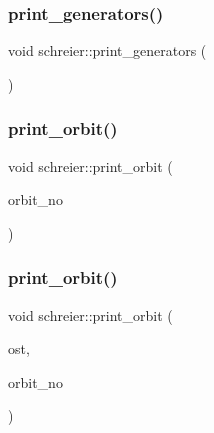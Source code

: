 \mbox{\label{classschreier_ac9fce8f85082d0bc5b4f5b8b18a99bab}} 
\subsubsection{\texorpdfstring{print\+\_\+generators()}{print\_generators()}}
{\footnotesize\ttfamily void schreier\+::print\+\_\+generators (\begin{DoxyParamCaption}{ }\end{DoxyParamCaption})}

\mbox{\label{classschreier_ac30bbfe09706ff8ccaf27c2cf8074594}} 
\subsubsection{\texorpdfstring{print\+\_\+orbit()}{print\_orbit()}\hspace{0.1cm}{\footnotesize\ttfamily [1/3]}}
{\footnotesize\ttfamily void schreier\+::print\+\_\+orbit (\begin{DoxyParamCaption}\item[{\mbox{\hyperlink{galois_8h_a09fddde158a3a20bd2dcadb609de11dc}{I\+NT}}}]{orbit\+\_\+no }\end{DoxyParamCaption})}

\mbox{\label{classschreier_af169ab35e35d07487771103a78e57222}} 
\subsubsection{\texorpdfstring{print\+\_\+orbit()}{print\_orbit()}\hspace{0.1cm}{\footnotesize\ttfamily [2/3]}}
{\footnotesize\ttfamily void schreier\+::print\+\_\+orbit (\begin{DoxyParamCaption}\item[{ostream \&}]{ost,  }\item[{\mbox{\hyperlink{galois_8h_a09fddde158a3a20bd2dcadb609de11dc}{I\+NT}}}]{orbit\+\_\+no }\end{DoxyParamCaption})}

